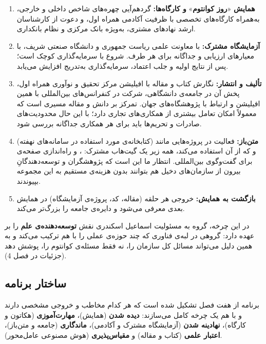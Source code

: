 \documentclass[a4paper,12pt]{article}
\begin{document}
	\begin{enumerate}[rightmargin=0.5cm, itemsep=5pt]
		\item \textbf{همایش} «\textbf{روز کوانتوم}» \textbf{و کارگاه‌ها:} گردهم‌آیی چهره‌های شاخص داخلی و خارجی، به‌همراه کارگاه‌های تخصصی با ظرفیت آکادمی همراه اول،
		و دعوت از کارشناسان ارشد نهادهای مشتری، به‌ویژه بانک مرکزی و نظام بانکداری.
		\item \textbf{آزمایشگاه مشترک:} با معاونت علمی ریاست جمهوری و دانشگاه صنعتی شریف، با معیارهای ارزیابی و  جداگانه برای هر طرف.
		شروع با سرمایه‌گذاری کوچک است؛ پس از نتایج اولیه و جلب اعتماد، سرمایه‌گذاری به‌تدریج افزایش می‌یابد.
		\item \textbf{تألیف و انتشار:} نگارش کتاب و مقاله با افیلیشن مرکز تحقیق و نوآوری همراه اول، پخش آن در جامعه‌ی دانشگاهی،
		شرکت در کنفرانس‌های بین‌المللی با همین افیلیشن و ارتباط با پژوهشگاه‌های جهان.
		تمرکز بر دانش و مقاله مسیری است که معمولاً امکان تعامل بیشتری از همکاری‌های تجاری دارد؛
		با این حال محدودیت‌های صادرات و تحریم‌ها باید برای هر همکاری جداگانه بررسی شود.
		\item \textbf{متن‌باز:} فعالیت در پروژه‌هایی مانند  (کتابخانه‌ی  مورد استفاده در سامانه‌های نهفته) و 
		که  از آن استفاده می‌کند، همه زیر یک گیت‌هاب مشترک:
		\href{https://github.com/mci-quantum-lab}{}،
		و راه‌اندازی صفحه‌ی  برای گفت‌وگوی بین‌المللی.
		انتظار ما این است که پژوهشگران و توسعه‌دهندگانِ بیرون از سازمان‌های دخیل هم بتوانند بدون هزینه‌ی مستقیم به این مجموعه بپیوندند.
		\item \textbf{بازگشت به همایش:} خروجی هر حلقه (مقاله، کد، پروژه‌ی آزمایشگاه) در همایش بعدی معرفی می‌شود
		و دایره‌ی جامعه را بزرگ‌تر می‌کند.
	\end{enumerate}

	در این چرخه، گروه به مسئولیت اسماعیل اسکندری نقش \textbf{توسعه‌دهنده‌ی علم} را بر عهده دارد:
	گروهی در لبه‌ی فناوری که چند حوزه‌ی عملی را با هم ترکیب می‌کند و به همین دلیل می‌تواند مسائل کل سازمان را، نه فقط مسئله‌ی کوانتوم را، پوشش دهد (جزئیات در فصل 4).

	\subsection*{ساختار برنامه}

	برنامه از هفت فصل تشکیل شده است که هر کدام مخاطب و خروجی مشخصی دارند
	و با هم یک چرخه کامل می‌سازند: \textbf{دیده شدن} (همایش)، \textbf{مهارت‌آموزی} (هکاتون و کارگاه)،
	\textbf{نهادینه شدن} (آزمایشگاه مشترک و آکادمی)، \textbf{ماندگاری} (جامعه و متن‌باز)،
	\textbf{اعتبار علمی} (کتاب و مقاله) و \textbf{مقیاس‌پذیری} (هوش مصنوعی عامل‌محور).
\end{document}
